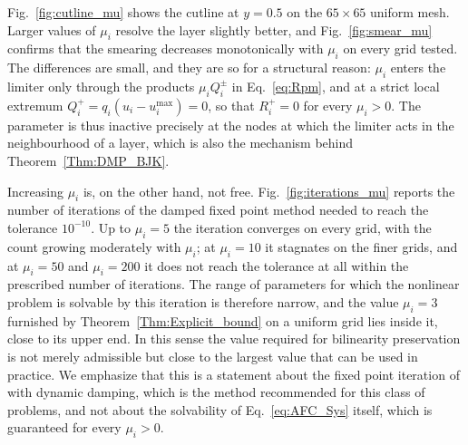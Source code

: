 \documentclass[a4paper]{article}
\theoremstyle{plain}
\theoremstyle{definition}
\theoremstyle{remark}
\begin{document}
Fig.~\ref{fig:cutline_mu} shows the cutline at $y = 0.5$ on the $65 \times 65$
uniform mesh. Larger values of $\mu_i$ resolve the layer slightly better, and
Fig.~\ref{fig:smear_mu} confirms that the smearing decreases monotonically with
$\mu_i$ on every grid tested. The differences are small, and they are so for a
structural reason: $\mu_i$ enters the limiter only through the products
$\mu_i Q_i^{\pm}$ in Eq.~\eqref{eq:Rpm}, and at a strict local extremum
$Q_i^{+} = q_i(u_i - u_i^{\max}) = 0$, so that $R_i^{+} = 0$ for every
$\mu_i > 0$. The parameter is thus inactive precisely at the nodes at which the
limiter acts in the neighbourhood of a layer, which is also the mechanism behind
Theorem~\ref{Thm:DMP_BJK}.

Increasing $\mu_i$ is, on the other hand, not free. Fig.~\ref{fig:iterations_mu}
reports the number of iterations of the damped fixed point method needed to reach
the tolerance $10^{-10}$. Up to $\mu_i = 5$ the iteration converges on every grid,
with the count growing moderately with $\mu_i$; at $\mu_i = 10$ it stagnates on the
finer grids, and at $\mu_i = 50$ and $\mu_i = 200$ it does not reach the tolerance at
all within the prescribed number of iterations. The range of parameters for which
the nonlinear problem is solvable by this iteration is therefore narrow, and the
value $\mu_i = 3$ furnished by Theorem~\ref{Thm:Explicit_bound} on a uniform grid
lies inside it, close to its upper end. In this sense the value required for
bilinearity preservation is not merely admissible but close to the largest value
that can be used in practice. We emphasize that this is a statement about the
fixed point iteration of \cite{JJ19} with dynamic damping, which is the
method recommended for this class of problems, and not about the solvability of
Eq.~\eqref{eq:AFC_Sys} itself, which is guaranteed for every $\mu_i > 0$.
\end{document}
